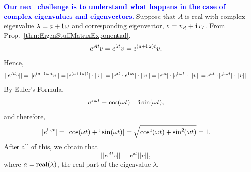 \bigskip 

\textcolor{blue}{\bf Our next challenge is to understand what happens in the case of complex eigenvalues and eigenvectors.} Suppose that $A$ is real with complex eigenvalue $\lambda = a + \mathop{\bm{\mathrm i}} \omega$ and corresponding eigenvector, $v = v_R + \mathop{\bm{\mathrm i}} v_I$. From Prop.~\ref{thm:EigenStuffMatrixExponential}, 
$$e^{At} v = e^{\lambda t} v = e^{(a + \mathop{\bm{\mathrm i}} \omega)t} v.$$
Hence, 
$$ ||e^{At} v|| = ||e^{(a + \mathop{\bm{\mathrm i}} \omega)t }v|| = |e^{(a + \mathop{\bm{\mathrm i}} \omega)t }| \cdot ||v|| = |e^{at} \cdot e^{\mathop{\bm{\mathrm i}} \omega t }| \cdot ||v||= |e^{at}| \cdot |e^{\mathop{\bm{\mathrm i}} \omega t}| \cdot ||v|| = e^{at} \cdot |e^{\mathop{\bm{\mathrm i}} \omega t}| \cdot ||v||. $$
By Euler's Formula, 
$$e^{\mathop{\bm{\mathrm i}} \omega t} = \cos( \omega t) + \mathop{\bm{\mathrm i}} \sin( \omega t),$$
and therefore, 
$$|e^{\mathop{\bm{\mathrm i}} \omega t}| = |\cos( \omega t) + \mathop{\bm{\mathrm i}} \sin( \omega t)| = \sqrt{\cos^2( \omega t) + \sin^2( \omega t)} = 1.$$
After all of this, we obtain that
$$||e^{At} v|| = e^{at} ||v||,$$
where $a={{\rm real}(\lambda)}$, the real part of the eigenvalue $\lambda$. 

\vspace*{.8cm} 

